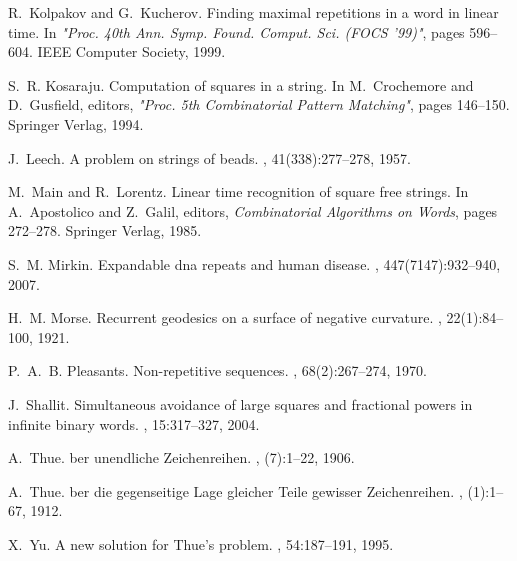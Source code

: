 \documentclass[12pt]{article}
\begin{document}
\begin{thebibliography}{10}
R.~Kolpakov and G.~Kucherov.
\newblock Finding maximal repetitions in a word in linear time.
\newblock In {\em "Proc. 40th Ann. Symp. Found. Comput. Sci. (FOCS '99)"},
  pages 596--604. IEEE Computer Society, 1999.

S.~R. Kosaraju.
\newblock Computation of squares in a string.
\newblock In M.~Crochemore and D.~Gusfield, editors, {\em "Proc. 5th
  Combinatorial Pattern Matching"}, pages 146--150. Springer Verlag, 1994.

J.~Leech.
\newblock A problem on strings of beads.
, 41(338):277--278, 1957.

M.~Main and R.~Lorentz.
\newblock Linear time recognition of square free strings.
\newblock In A.~Apostolico and Z.~Galil, editors, {\em Combinatorial Algorithms
  on Words}, pages 272--278. Springer Verlag, 1985.

S.~M. Mirkin.
\newblock Expandable dna repeats and human disease.
, 447(7147):932--940, 2007.

H.~M. Morse.
\newblock Recurrent geodesics on a surface of negative curvature.
, 22(1):84--100, 1921.

P.~A.~B. Pleasants.
\newblock Non-repetitive sequences.
, 68(2):267--274, 1970.

J.~Shallit.
\newblock Simultaneous avoidance of large squares and fractional powers in
  infinite binary words.
, 15:317--327, 2004.

A.~Thue.
ber unendliche {Zeichenreihen}.
, (7):1--22, 1906.

A.~Thue.
ber die gegenseitige {Lage} gleicher {Teile} gewisser
  {Zeichenreihen}.
, (1):1--67, 1912.

X.~Yu.
\newblock A new solution for {Thue}'s problem.
, 54:187--191, 1995.

\end{thebibliography}
\end{document}

